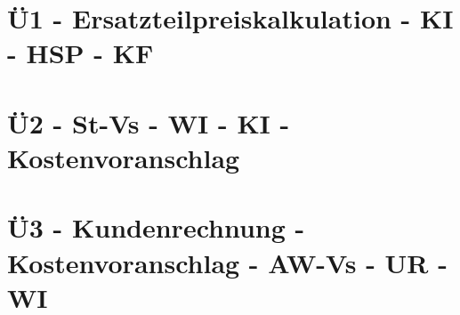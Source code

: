 \section{Ü1 - Ersatzteilpreiskalkulation - KI - HSP - KF}\label{sec:U01-Ersatzteilpreiskalkulation-KI-HSP-KF}

 \newpage


\section{Ü2 - St-Vs - WI - KI - Kostenvoranschlag}\label{sec:U02-StVs-WI-KI-Kostenvoranschlag}

 \newpage


\section{Ü3 - Kundenrechnung - Kostenvoranschlag - AW-Vs - UR - WI}\label{sec:U03-Kundenrechnung-Kostenvoranschlag-AW-Vs-UR-WI}


 \newpage


